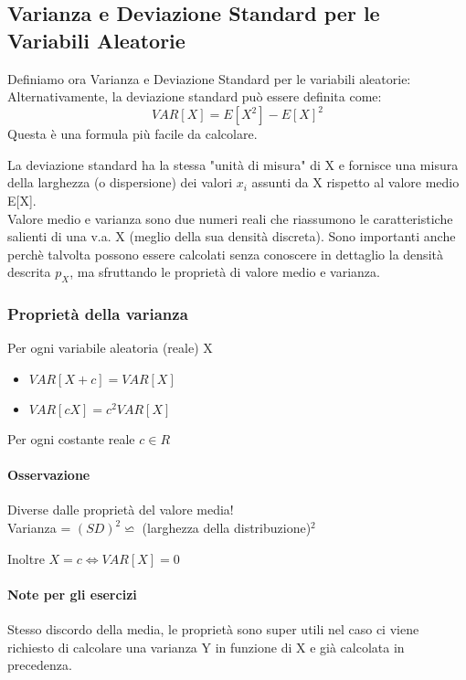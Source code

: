 \subsection[Varianza e Deviazione Standard]{Varianza e Deviazione Standard per le Variabili Aleatorie}
Definiamo ora Varianza e Deviazione Standard per le variabili aleatorie:
Alternativamente, la deviazione standard può essere definita come:
\[ VAR[X] = E[X^2] - E[X]^2 \]
Questa è una formula più facile da calcolare.

La deviazione standard ha la stessa "unità di misura" di X e fornisce 
una misura della larghezza (o dispersione) dei valori $x_i$ assunti da X rispetto
al valore medio E[X].
\\Valore medio e varianza sono due numeri reali che riassumono
le caratteristiche salienti di una v.a. X (meglio della sua densità discreta).
Sono importanti anche perchè talvolta possono essere calcolati
senza conoscere in dettaglio la densità descrita $p_X$, ma sfruttando le
proprietà di valore medio e varianza.

\subsubsection{Proprietà della varianza}
Per ogni variabile aleatoria (reale) X
\begin{itemize}
    \item $VAR[X+c] = VAR[X]$
    \item $VAR[cX] = c^2 VAR[X]$
\end{itemize}
Per ogni costante reale $c \in R$
\paragraph{Osservazione} Diverse dalle proprietà del valore media!
\\ Varianza = $(SD)^2 \backsimeq $ (larghezza della distribuzione)$^2$
\begin{center}
    Inoltre $X = c \Leftrightarrow VAR[X] = 0$
\end{center}

\paragraph*{Note per gli esercizi} Stesso discordo della media, le proprietà sono super
utili nel caso ci viene richiesto di calcolare una varianza Y in funzione di X e già
calcolata in precedenza.

